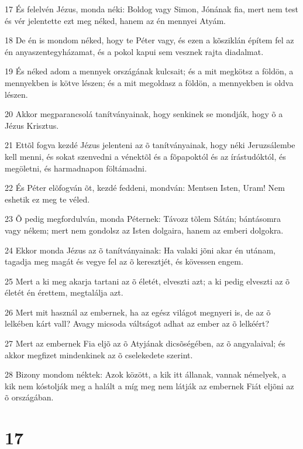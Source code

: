 \par 17 És felelvén Jézus, monda néki: Boldog vagy Simon, Jónának fia, mert nem test és vér jelentette ezt meg néked, hanem az én mennyei Atyám.
\par 18 De én is mondom néked, hogy te Péter vagy, és ezen a kõsziklán építem fel az én anyaszentegyházamat, és a pokol kapui sem vesznek rajta diadalmat.
\par 19 És néked adom a mennyek országának kulcsait; és a mit megkötsz a földön, a mennyekben is kötve lészen; és a mit megoldasz a földön, a mennyekben is oldva lészen.
\par 20 Akkor megparancsolá tanítványainak, hogy senkinek se mondják, hogy õ a Jézus Krisztus.
\par 21 Ettõl fogva kezdé Jézus jelenteni az õ tanítványainak, hogy néki Jeruzsálembe kell menni, és sokat szenvedni a vénektõl és a fõpapoktól és az írástudóktól, és megöletni, és harmadnapon  föltámadni.
\par 22 És Péter elõfogván õt, kezdé feddeni, mondván: Mentsen Isten, Uram! Nem eshetik ez meg te véled.
\par 23 Õ pedig megfordulván, monda Péternek: Távozz tõlem Sátán; bántásomra vagy nékem; mert nem gondolsz az Isten dolgaira, hanem az emberi dolgokra.
\par 24 Ekkor monda Jézus az õ tanítványainak: Ha valaki jõni akar én utánam, tagadja meg magát és vegye fel az õ keresztjét,  és kövessen engem.
\par 25 Mert a ki meg akarja tartani az õ életét, elveszti azt; a ki pedig elveszti az õ életét én érettem, megtalálja azt.
\par 26 Mert mit használ az embernek, ha az egész világot megnyeri is, de az õ lelkében kárt vall? Avagy micsoda váltságot adhat az ember az õ lelkéért?
\par 27 Mert az embernek Fia eljõ az õ Atyjának dicsõségében, az õ angyalaival; és akkor megfizet mindenkinek az õ cselekedete szerint.
\par 28 Bizony mondom néktek: Azok között, a kik itt állanak, vannak némelyek, a kik nem kóstolják meg a halált a míg meg nem látják az embernek Fiát eljõni  az õ országában.

\chapter{17}

